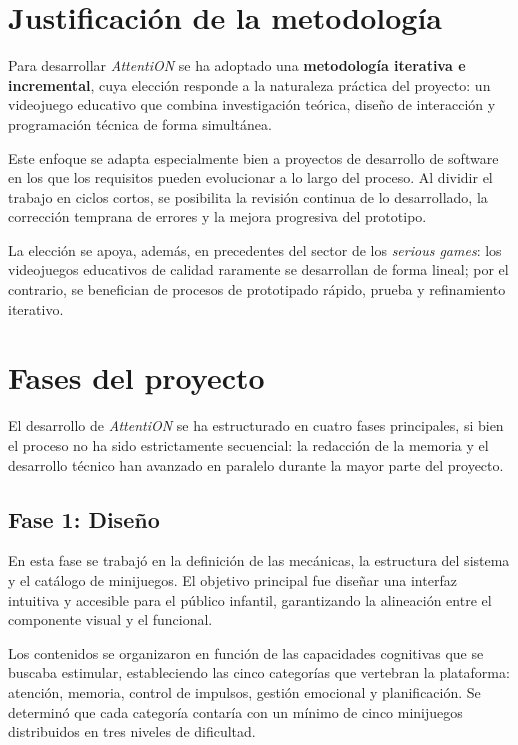 \documentclass[12pt, a4paper]{report}
\begin{document}
\section{Justificación de la metodología}

Para desarrollar \textit{AttentiON} se ha adoptado una \textbf{metodología
iterativa e incremental}, cuya elección responde a la naturaleza práctica del
proyecto: un videojuego educativo que combina investigación teórica, diseño
de interacción y programación técnica de forma simultánea.

Este enfoque se adapta especialmente bien a proyectos de desarrollo de
software en los que los requisitos pueden evolucionar a lo largo del proceso.
Al dividir el trabajo en ciclos cortos, se posibilita la revisión continua de
lo desarrollado, la corrección temprana de errores y la mejora progresiva del
prototipo.

La elección se apoya, además, en precedentes del sector de los
\textit{serious games}: los videojuegos educativos de calidad raramente se
desarrollan de forma lineal; por el contrario, se benefician de procesos de
prototipado rápido, prueba y refinamiento iterativo.

\section{Fases del proyecto}

El desarrollo de \textit{AttentiON} se ha estructurado en cuatro fases principales,
si bien el proceso no ha sido estrictamente secuencial: la redacción de la memoria
y el desarrollo técnico han avanzado en paralelo durante la mayor parte del
proyecto.

\subsection{Fase 1: Diseño}

En esta fase se trabajó en la definición de las mecánicas, la estructura del
sistema y el catálogo de minijuegos. El objetivo principal fue diseñar una
interfaz intuitiva y accesible para el público infantil, garantizando la
alineación entre el componente visual y el funcional.

Los contenidos se organizaron en función de las capacidades cognitivas que se
buscaba estimular, estableciendo las cinco categorías que vertebran la
plataforma: atención, memoria, control de impulsos, gestión emocional y
planificación. Se determinó que cada categoría contaría con un mínimo de cinco
minijuegos distribuidos en tres niveles de dificultad.
\end{document}
